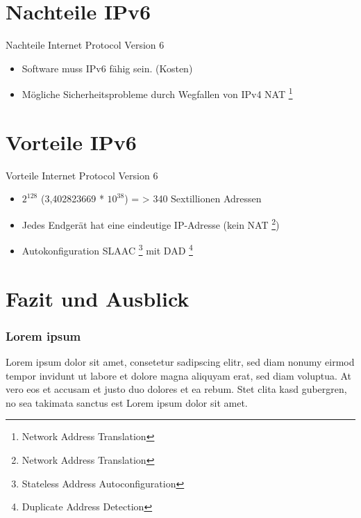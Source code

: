 \documentclass[xcolor=dvipsnames]{beamer}
\begin{document}

\section{Nachteile IPv6}
\begin{frame}
  \begin{alertblock}{Nachteile Internet Protocol Version 6}
	  \begin{itemize}
	    \item Software muss IPv6 fähig sein. (Kosten)
	    \item Mögliche Sicherheitsprobleme durch Wegfallen von IPv4 NAT \footnote{Network Address Translation}
	  \end{itemize}
  \end{alertblock}
\end{frame}

\section{Vorteile IPv6}
\begin{frame}
  \begin{block}{Vorteile Internet Protocol Version 6}
	  \begin{itemize}
  		\item $2^{128}$ (3,402823669 * $10^{38}$) = > 340 Sextillionen Adressen
  		\item Jedes Endgerät hat eine eindeutige IP-Adresse (kein NAT \footnote{Network Address Translation})
  		\item Autokonfiguration SLAAC \footnote{Stateless Address Autoconfiguration} mit DAD \footnote{Duplicate Address Detection}
 
	  \end{itemize}
  \end{block}
\end{frame}



\section{Fazit und Ausblick}
\begin{frame}
 \frametitle{Lorem ipsum}
  Lorem ipsum dolor sit amet, consetetur sadipscing elitr, sed diam nonumy eirmod tempor invidunt ut labore et dolore magna aliquyam erat, sed diam voluptua. At vero eos et accusam et justo duo dolores et ea rebum. Stet clita kasd gubergren, no sea takimata sanctus est Lorem ipsum dolor sit amet.
\end{frame}
\end{document}
